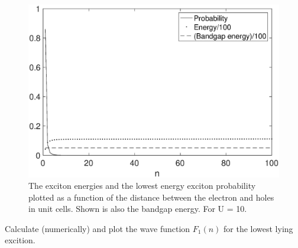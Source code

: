 \begin{figure}[!ht]
      \centering
      \includegraphics[width = 0.7\linewidth]{fig/ExcitonStateU10.eps}
      \caption{The exciton energies and the lowest energy exciton probability plotted as a function of the distance between the electron and holes in unit cells. Shown is also the bandgap energy. For U = 10.}
      \label{fig:U10}
\end{figure}

\begin{exercise}
Calculate (numerically) and plot the wave function $F_1(n)$ for the lowest lying excition.
\end{exercise}
\begin{solution}

\end{solution}